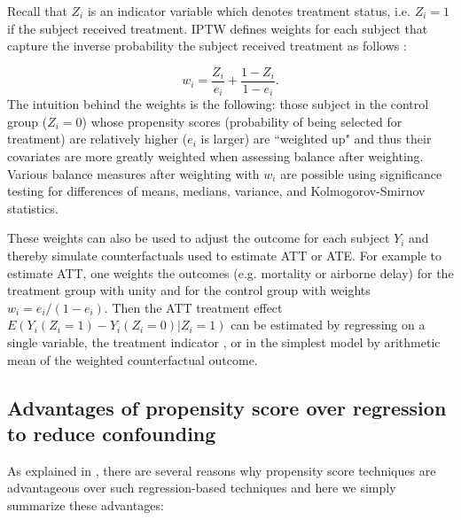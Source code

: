 \documentclass[11pt]{scrartcl}
\begin{document}
Recall that $Z_i$ is an indicator variable which denotes treatment status, i.e. $Z_i=1$ if the subject received treatment.  IPTW defines weights for each subject that capture the inverse probability the subject received treatment as follows \cite{austin2011introduction}:

\begin{equation}
w_i = \frac{Z_i}{e_i} + \frac{1-Z_i}{1-e_i}.
\end{equation}
The intuition behind the weights is the following: those subject in the control group ($Z_i=0$) whose propensity scores (probability of being selected for treatment) are relatively higher ($e_i$ is  larger) are ``weighted up" and thus their covariates are more greatly weighted when assessing balance after weighting.  Various balance measures after weighting with $w_i$ are possible using significance testing for differences of means, medians, variance, and Kolmogorov-Smirnov statistics\cite{ridgeway2015toolkit}.   

These weights can also be used to adjust the outcome for each subject $Y_i$ and thereby simulate counterfactuals used to estimate ATT or ATE.  For example to estimate ATT, one weights the outcomes (e.g. mortality or airborne delay) for the treatment group with unity and for the control group with weights $w_i=e_i/(1-e_i)$.  Then the ATT treatment effect $E(Y_i(Z_i=1)-Y_i(Z_i=0)|Z_i=1)$ can be estimated by regressing on a single variable, the treatment indicator \cite{ridgeway2015toolkit}, or in the simplest model by arithmetic mean of the weighted counterfactual outcome.  


\subsection*{Advantages of propensity score over regression to reduce confounding}
As explained in \cite{mccaffrey2013tutorial}, there are several reasons why propensity score techniques are advantageous over such regression-based techniques and here we simply summarize these advantages:
\end{document}
